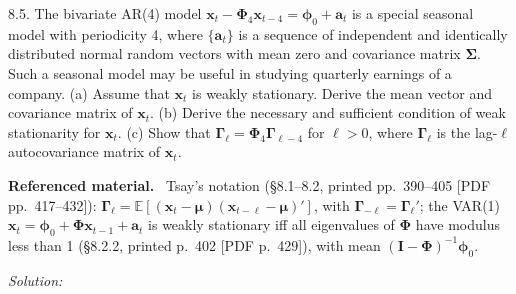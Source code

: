 \documentclass[11pt,a4paper]{article}
\newif\ifsolucoes
\newcommand{\espacoresol}{4.5cm}   %
\numberwithin{equation}{questao}   %
\newenvironment{refmat}{\par\smallskip\noindent\small\textbf{Referenced material.}\ }{\par\smallskip}
\newcommand{\resolespaco}{\ifsolucoes\else\par\textit{Solution:}\vspace{\espacoresol}\par\fi}
\newcommand{\E}{\mathbb{E}}
\begin{document}
8.5. The bivariate AR(4) model $\mathbf x_t-\boldsymbol\Phi_4\mathbf x_{t-4}=\boldsymbol\phi_0+\mathbf a_t$
is a special seasonal model with periodicity 4, where $\{\mathbf a_t\}$ is a sequence of independent and
identically distributed normal random vectors with mean zero and covariance matrix $\boldsymbol\Sigma$.
Such a seasonal model may be useful in studying quarterly earnings of a company. (a) Assume that
$\mathbf x_t$ is weakly stationary. Derive the mean vector and covariance matrix of $\mathbf x_t$.
(b) Derive the necessary and sufficient condition of weak stationarity for $\mathbf x_t$. (c) Show that
$\boldsymbol\Gamma_\ell=\boldsymbol\Phi_4\boldsymbol\Gamma_{\ell-4}$ for $\ell>0$, where $\boldsymbol\Gamma_\ell$
is the lag-$\ell$ autocovariance matrix of $\mathbf x_t$.
\begin{refmat}
Tsay's notation (§8.1--8.2, printed pp.~390--405 [PDF pp.~417--432]): $\boldsymbol\Gamma_\ell=
\E[(\mathbf x_t-\boldsymbol\mu)(\mathbf x_{t-\ell}-\boldsymbol\mu)']$, with
$\boldsymbol\Gamma_{-\ell}=\boldsymbol\Gamma_\ell'$; the VAR(1) $\mathbf x_t=\boldsymbol\phi_0+\boldsymbol\Phi\mathbf
x_{t-1}+\mathbf a_t$ is weakly stationary iff all eigenvalues of $\boldsymbol\Phi$ have modulus less than 1
(§8.2.2, printed p.~402 [PDF p.~429]), with mean $(\mathbf I-\boldsymbol\Phi)^{-1}\boldsymbol\phi_0$.
\end{refmat}
\resolespaco
\end{document}
